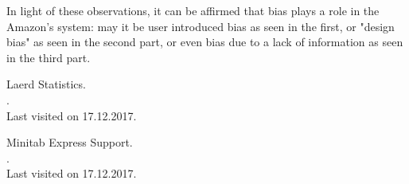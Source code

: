 \documentclass[11pt]{article}
\begin{document}
In light of these observations, it can be affirmed that bias plays a role in the Amazon's system: may it be user introduced bias as seen in the first, or "design bias" as seen in the second part, or even bias due to a lack of information as seen in the third part.

\nocite{laerd}
\nocite{minitab}



\begin{thebibliography}{}

 Laerd Statistics.\\
.\\
\newblock Last visited on 17.12.2017.

Minitab Express Support.\\
.\\
\newblock Last visited on 17.12.2017.

\end{thebibliography}
\end{document}
